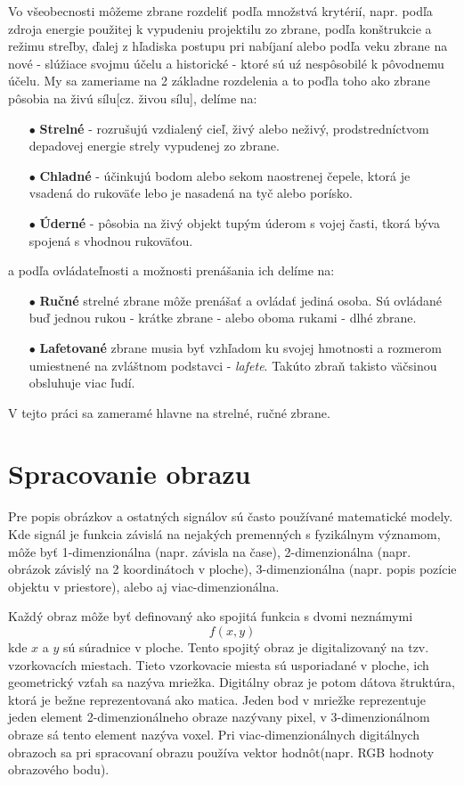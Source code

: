 Vo všeobecnosti môžeme zbrane rozdeliť podľa množstvá krytérií, napr. podľa zdroja energie použitej k vypudeniu projektilu zo zbrane,
podľa konštrukcie a režimu streľby, ďalej z hľadiska postupu pri nabíjaní alebo podľa veku zbrane na nové - slúžiace svojmu účelu a historické - ktoré sú uź nespôsobilé k pôvodnemu účelu.
My sa zameriame na 2 základne rozdelenia a to poďla toho ako zbrane pôsobia na živú sílu[cz. živou sílu], delíme na\cite{book:StrelneZbrane}:
\begin{enumerate}
	\item[$\bullet$] \textbf{Strelné} - rozrušujú vzdialený cieľ, živý alebo neživý, prodstredníctvom depadovej energie strely vypudenej zo zbrane.
	\item[$\bullet$] \textbf{Chladné} - účinkujú bodom alebo sekom naostrenej čepele, ktorá je vsadená do rukoväťe lebo je nasadená na tyč alebo porísko.
    \item[$\bullet$] \textbf{Úderné} - pôsobia na živý objekt tupým úderom s vojej časti, tkorá býva spojená s vhodnou rukoväťou.
\end{enumerate}
a podľa ovládateľnosti a možnosti prenášania ich delíme na\cite{book:StrelneZbrane}:
\begin{enumerate}
	\item[$\bullet$] \textbf{Ručné} strelné zbrane môže prenášať a ovládať jediná osoba. Sú ovládané buď jednou rukou - krátke zbrane - alebo oboma rukami - dlhé zbrane.
	\item[$\bullet$] \textbf{Lafetované} zbrane musia byť vzhľadom ku svojej hmotnosti a rozmerom umiestnené na zvláštnom podstavci - \textit{lafete}. Takúto zbraň takisto väčsinou obsluhuje viac ľudí.
\end{enumerate}
V tejto práci sa zameramé hlavne na strelné, ručné zbrane.


\section{Spracovanie obrazu}
Pre popis obrázkov a ostatných signálov sú často používané matematické modely.
Kde signál je funkcia závislá na nejakých premenných s fyzikálnym významom, môže byť 1-dimenzionálna (napr. závisla na čase),
2-dimenzionálna (napr. obrázok závislý na 2 koordinátoch v ploche), 3-dimenzionálna (napr. popis pozície objektu v priestore), alebo aj viac-dimenzionálna\cite{book:ImageProcessing}.

    Každý obraz môže byť definovaný ako spojitá funkcia s dvomi neznámymi $$f(x,y)$$ kde $x$ a $y$ sú súradnice v ploche.
Tento spojitý obraz je digitalizovaný na tzv. vzorkovacích miestach.
Tieto vzorkovacie miesta sú usporiadané v ploche, ich geometrický vzťah sa nazýva mriežka.
Digitálny obraz je potom dátova štruktúra, ktorá je bežne reprezentovaná ako matica.
Jeden bod v mriežke reprezentuje jeden element 2-dimenzionálneho obraze nazývany pixel, v 3-dimenzionálnom obraze sá tento element nazýva voxel\cite{book:ImageProcessing}.
Pri viac-dimenzionálnych digitálnych obrazoch sa pri spracovaní obrazu používa vektor hodnôt(napr. RGB hodnoty obrazového bodu).

